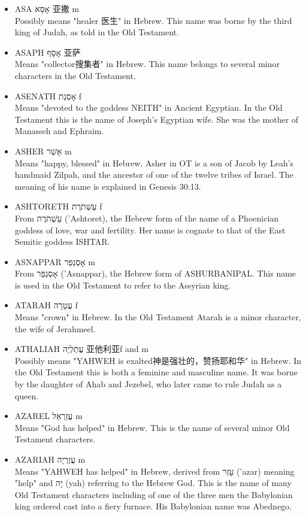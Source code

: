 \begin{itemize}
\item {ASA אָסָא 亚撒 m}\\
Possibly means "healer 医生" in Hebrew. This name was borne by the third king of Judah, as told in the Old Testament.
\item {ASAPH אָסָף 亚萨 }\\
Means "collector搜集者" in Hebrew. This name belongs to several minor characters in the Old Testament.
\item {ASENATH אָסְנַת f}\\
Means "devoted to the goddess NEITH" in Ancient Egyptian. In the Old Testament this is the name of Joseph's Egyptian wife. She was the mother of Manasseh and Ephraim.
\item{ASHER אָשֵׁר m}\\
Means "happy, blessed" in Hebrew. Asher in OT is a son of Jacob by Leah's handmaid Zilpah, and the ancestor of one of the twelve tribes of Israel. The meaning of his name is explained in Genesis 30:13.
\item {ASHTORETH עַשְׁתֹרֶת f}\\
From עַשְׁתֹרֶת ('Ashtoret), the Hebrew form of the name of a Phoenician goddess of love, war and fertility. Her name is cognate to that of the East Semitic goddess ISHTAR.
\item {ASNAPPAR אָסְנַפַּר m}\\
From אָסְנַפַּר ('Asnappar), the Hebrew form of ASHURBANIPAL. This name is used in the Old Testament to refer to the Assyrian king.
\item {ATARAH עֲטָרָה f}\\
Means "crown" in Hebrew. In the Old Testament Atarah is a minor character, the wife of Jerahmeel.
\item {ATHALIAH עֲתַלְיָה 亚他利亚f and m}\\
Possibly means "YAHWEH is exalted神是强壮的，赞扬耶和华" in Hebrew. In the Old Testament this is both a feminine and masculine name. It was borne by the daughter of Ahab and Jezebel, who later came to rule Judah as a queen.
\item {AZAREL עֲזַרְאֵל m}\\
Means "God has helped" in Hebrew. This is the name of several minor Old Testament characters.
\item {AZARIAH עֲזַרְיָה m}\\
Means "YAHWEH has helped" in Hebrew, derived from עָזַר ('azar) meaning "help" and יָה (yah) referring to the Hebrew God. This is the name of many Old Testament characters including of one of the three men the Babylonian king ordered cast into a fiery furnace. His Babylonian name was Abednego.

\end{itemize}
